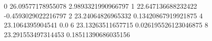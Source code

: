 0 26.09577178955078 2.9893321990966797
1 22.647136688232422 -0.4593029022216797
2 23.24064826965332 0.13420867919921875
4 23.1064395904541 0.0
6 23.13263511657715 0.026195526123046875
8 23.291553497314453 0.18511390686035156
